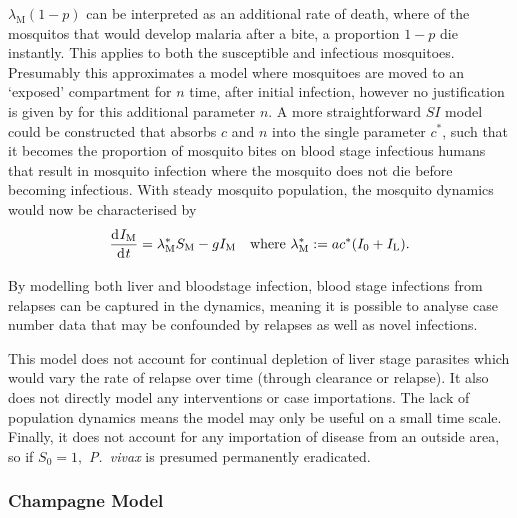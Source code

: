 $\lambda_\mathrm{M}(1 - p)$ can be interpreted as an additional rate of death,
where of the mosquitos that would develop malaria after a bite, a proportion
$1 - p$ die instantly. This applies to both the susceptible and infectious
mosquitoes. Presumably this approximates a model where mosquitoes are moved
to an `exposed' compartment for $n$ time, after initial infection,
however no justification is given by  for
this additional parameter $n$. A more straightforward $SI$ model could be
constructed that absorbs $c$ and $n$ into the single parameter $c^*$, such
that it becomes the proportion of mosquito bites on blood stage infectious
humans that result in mosquito infection where the mosquito does not die
before becoming infectious. With steady mosquito population, the mosquito
dynamics would now be characterised by
$$
    \frac{\diff I_\mathrm{M}}{\diff t}
    = \lambda_\mathrm{M}^*S_\mathrm{M} - gI_\mathrm{M}
    \quad\text{where } \lambda_\mathrm{M}^*:= ac^*(I_0 + I_\mathrm{L}).
$$

By modelling both liver and bloodstage infection, blood stage infections
from relapses can be captured in the dynamics, meaning it is possible to
analyse case number data that may be confounded by relapses as well as
novel infections.


This model does not account for continual depletion of liver stage parasites
which would vary the rate of relapse over time (through clearance or relapse).
It also does not directly model any interventions or case importations. The
lack of population dynamics means the model may only be useful on a small time
scale. Finally, it does not account for any importation of disease from an
outside area, so if $S_0 = 1,$ \textit{P.\ vivax} is presumed permanently
eradicated.

\subsubsection*{Champagne Model}\label{sec:champ_mod}

